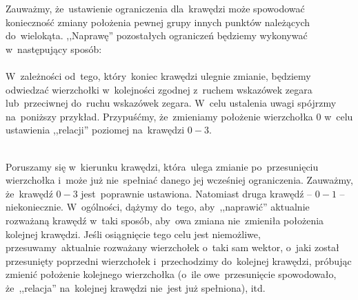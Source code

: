\documentclass[11pt, a4paper]{article}
\begin{document}
Zauważmy, że~ustawienie ograniczenia dla~krawędzi może spowodować konieczność zmiany położenia pewnej grupy innych punktów
 należących do~wielokąta. ,,Naprawę'' pozostałych ograniczeń będziemy wykonywać w~następujący sposób: \\ \\
 W~zależności od~tego, który~koniec krawędzi ulegnie zmianie, będziemy odwiedzać wierzchołki w~kolejności zgodnej
 z~ruchem wskazówek zegara
 lub~przeciwnej do~ruchu wskazówek zegara.
 \newpage \noindent
 W~celu ustalenia uwagi spójrzmy na~poniższy przykład. Przypuśćmy, że~zmieniamy położenie
 wierzchołka $0$ w~celu ustawienia ,,relacji'' poziomej na~krawędzi $0 - 3$.
 
  \\
 Poruszamy się w~kierunku krawędzi, która~ulega zmianie po~przesunięciu wierzchołka i~może już nie~spełniać danego jej wcześniej
 ograniczenia.  Zauważmy, że~krawędź $0 - 3$ jest~poprawnie ustawiona. Natomiast druga krawędź -- $0 - 1$ -- niekoniecznie.
 W~ogólności, dążymy do~tego, aby~,,naprawić'' aktualnie rozważaną krawędź w~taki sposób, aby~owa zmiana nie~zmieniła
 położenia kolejnej krawędzi. Jeśli osiągnięcie tego celu jest niemożliwe, przesuwamy~aktualnie rozważany wierzchołek
 o~taki sam wektor, o~jaki został przesunięty poprzedni wierzchołek i~przechodzimy do~kolejnej
 krawędzi, próbując zmienić położenie kolejnego wierzchołka (o~ile owe~przesunięcie spowodowało, że~,,relacja'' na~kolejnej
 krawędzi nie~jest już spełniona), itd.
 
\end{document}
